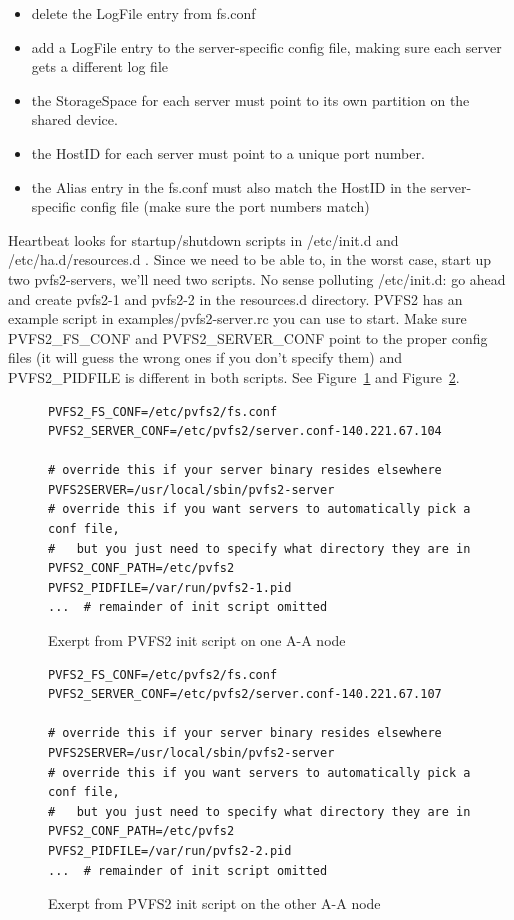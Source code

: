 \documentclass[11pt]{article}
\begin{document}
\begin{itemize}
	\item delete the LogFile entry from fs.conf
	\item add a LogFile entry to the server-specific config file, making
  	  sure each server gets a different log file
	\item the StorageSpace for each server must point to its own
 	  partition on the shared device.
	\item the HostID for each server must point to a unique port number.
	\item the Alias entry in the fs.conf must also match the HostID in
	  the server-specific config file (make sure the port numbers
	  match)
\end{itemize}

Heartbeat looks for startup/shutdown scripts in /etc/init.d and
/etc/ha.d/resources.d .  Since we need to be able to, in the worst case,
start up two pvfs2-servers, we'll need two scripts.  No sense
polluting /etc/init.d:  go ahead and create pvfs2-1 and pvfs2-2 in the
resources.d directory.  PVFS2 has an example script in
examples/pvfs2-server.rc you can use to start.  Make sure PVFS2\_FS\_CONF
and PVFS2\_SERVER\_CONF point to the proper config files (it will guess
the wrong ones if you don't specify them) and PVFS2\_PIDFILE is different
in both scripts.  See Figure~\ref{fig:init} and
Figure~\ref{fig:init-other}.

\begin{figure}
\begin{scriptsize}
\begin{verbatim}
PVFS2_FS_CONF=/etc/pvfs2/fs.conf
PVFS2_SERVER_CONF=/etc/pvfs2/server.conf-140.221.67.104
        
# override this if your server binary resides elsewhere
PVFS2SERVER=/usr/local/sbin/pvfs2-server
# override this if you want servers to automatically pick a conf file,
#   but you just need to specify what directory they are in
PVFS2_CONF_PATH=/etc/pvfs2
PVFS2_PIDFILE=/var/run/pvfs2-1.pid
...  # remainder of init script omitted
\end{verbatim}
\end{scriptsize}
\caption{Exerpt from PVFS2 init script on one A-A node}
\label{fig:init}
\end{figure}

\begin{figure}
\begin{scriptsize}
\begin{verbatim}
PVFS2_FS_CONF=/etc/pvfs2/fs.conf
PVFS2_SERVER_CONF=/etc/pvfs2/server.conf-140.221.67.107
        
# override this if your server binary resides elsewhere
PVFS2SERVER=/usr/local/sbin/pvfs2-server
# override this if you want servers to automatically pick a conf file,
#   but you just need to specify what directory they are in
PVFS2_CONF_PATH=/etc/pvfs2
PVFS2_PIDFILE=/var/run/pvfs2-2.pid
...  # remainder of init script omitted
\end{verbatim}
\end{scriptsize}
\caption{Exerpt from PVFS2 init script on the other A-A node}
\label{fig:init-other}
\end{figure}
\end{document}
